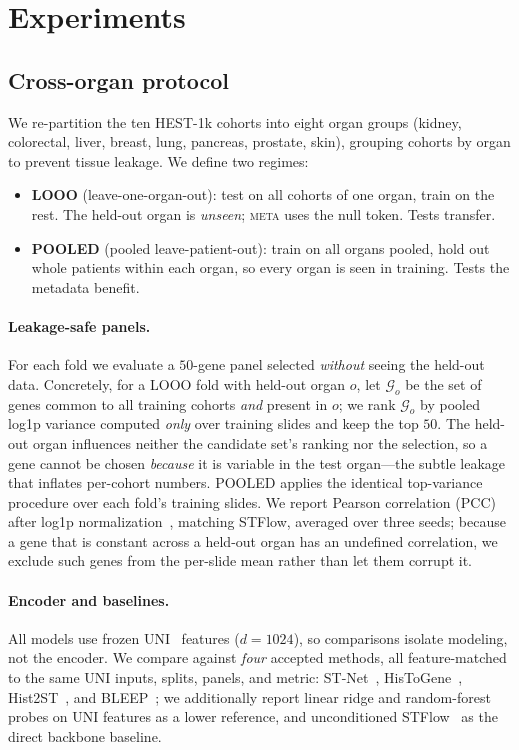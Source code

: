 \documentclass[10pt,twocolumn,letterpaper]{article}
\begin{document}
\section{Experiments}
\label{sec:exp}

\subsection{Cross-organ protocol}
We re-partition the ten HEST-1k cohorts into eight organ groups (kidney, colorectal, liver,
breast, lung, pancreas, prostate, skin), grouping cohorts by organ to prevent tissue leakage.
We define two regimes:
\begin{itemize}
\item \textbf{LOOO} (leave-one-organ-out): test on all cohorts of one organ, train on the rest.
The held-out organ is \emph{unseen}; \textsc{meta} uses the null token. Tests transfer.
\item \textbf{POOLED} (pooled leave-patient-out): train on all organs pooled, hold out whole
patients within each organ, so every organ is seen in training. Tests the metadata benefit.
\end{itemize}
\paragraph{Leakage-safe panels.} For each fold we evaluate a $50$-gene panel selected \emph{without}
seeing the held-out data. Concretely, for a LOOO fold with held-out organ $o$, let $\mathcal{G}_o$
be the set of genes common to all training cohorts \emph{and} present in $o$; we rank $\mathcal{G}_o$
by pooled log1p variance computed \emph{only} over training slides and keep the top $50$. The
held-out organ influences neither the candidate set's ranking nor the selection, so a gene cannot be
chosen \emph{because} it is variable in the test organ---the subtle leakage that inflates per-cohort
numbers. POOLED applies the identical top-variance procedure over each fold's training slides. We
report Pearson correlation (PCC) after log1p normalization~\cite{scanpy}, matching STFlow, averaged
over three seeds; because a gene that is constant across a held-out organ has an undefined
correlation, we exclude such genes from the per-slide mean rather than let them corrupt it.
\paragraph{Encoder and baselines.} All models use frozen UNI~\cite{uni} features ($d\!=\!1024$),
so comparisons isolate modeling, not the encoder. We compare against \emph{four} accepted methods,
all feature-matched to the same UNI inputs, splits, panels, and metric: ST-Net~\cite{stnet},
HisToGene~\cite{histogene}, Hist2ST~\cite{hist2st}, and BLEEP~\cite{bleep};
we additionally report linear ridge and random-forest probes on UNI features as a lower reference,
and unconditioned STFlow~\cite{stflow} as the direct backbone baseline.
\end{document}
